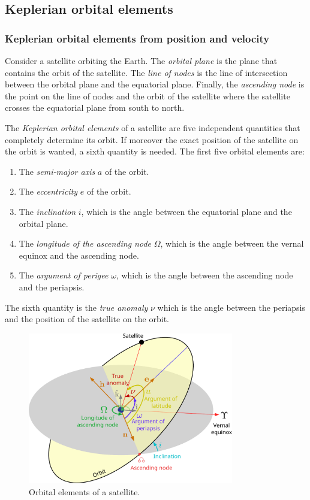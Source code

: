 \documentclass[../main.tex]{subfiles}
\begin{document}
\subsection{Keplerian orbital elements}
\subsubsection{Keplerian orbital elements from position and velocity}
\begin{definition}
  Consider a satellite orbiting the Earth. The \emph{orbital plane} is the plane that contains the orbit of the satellite. The \emph{line of nodes} is the line of intersection between the orbital plane and the equatorial plane. Finally, the \emph{ascending node} is the point on the line of nodes and the orbit of the satellite where the satellite crosses the equatorial plane from south to north.
\end{definition}
\begin{definition}
  The \emph{Keplerian orbital elements} of a satellite are five independent quantities that completely determine its orbit. If moreover the exact position of the satellite on the orbit is wanted, a sixth quantity is needed. The first five orbital elements are:
  \begin{enumerate}
    \item The \emph{semi-major axis} $a$ of the orbit.
    \item The \emph{eccentricity} $e$ of the orbit.
    \item The \emph{inclination} $i$, which is the angle between the equatorial plane and the orbital plane.
    \item The \emph{longitude of the ascending node} $\Omega$, which is the angle between the vernal equinox and the ascending node.
    \item The \emph{argument of perigee} $\omega$, which is the angle between the ascending node and the periapsis.
  \end{enumerate}
  The sixth quantity is the \emph{true anomaly} $\nu$ which is the angle between the periapsis and the position of the satellite on the orbit.
\end{definition}
\begin{figure}[ht]
  \centering
  \includegraphics[width=0.8\textwidth]{Images/orbital_elements.pdf}
  \caption{Orbital elements of a satellite.}
  \label{fig:orbital_elements}
\end{figure}
\end{document}
